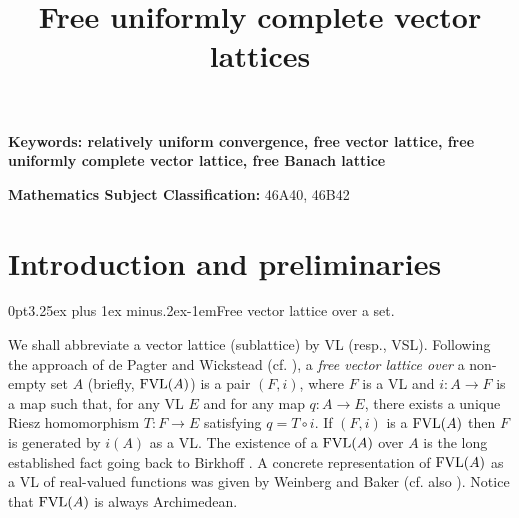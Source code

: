 \documentclass[12pt]{article}
\makeatletter
\newcommand{\R}{\mathbb{R}}
\renewcommand{\subsection}{\@startsection{subsection}{1}
{0pt}{3.25ex plus 1ex minus.2ex}{-1em}{\normalfont\normalsize\bf}}
\makeatother
\begin{document}
\title{Free uniformly complete vector lattices}
\date{\empty}
\maketitle
\author{}
\maketitle

\medskip
\medskip
\medskip

{\bf{Keywords:} \rm relatively uniform convergence, free vector lattice, 
free uniformly complete vector lattice, free Banach lattice}

\medskip

{\bf  Mathematics Subject Classification:} {\normalsize  46A40, 46B42}

%


\section{Introduction and preliminaries}

\subsection{Free vector lattice over a set.}

We shall abbreviate a vector lattice (sublattice) by VL (resp., VSL).
Following the approach of de Pagter and Wickstead (cf. \cite[Definition 3.1]{PW}),
a {\em free vector lattice over} a non-empty set $A$ (briefly, $\text{\rm FVL}(A)$) 
is a pair $(F,i)$, where $F$ is a VL and $i:A\to F$ is a map such that, 
for any VL $E$ and for any map $q :A\to E$, there exists 
a unique Riesz homomorphism $T: F \to E$ satisfying 
$q=T \circ i$. If $(F,i)$ is a $\text{\rm FVL}(A)$ then $F$ is generated by $i(A)$ as a VL. 
The existence of a $\text{\rm FVL}(A)$ over $A$ is the long 
established fact going back to Birkhoff \cite{Birk}. A concrete representation 
of $\text{\rm FVL}(A)$ as a VL of real-valued functions was 
given by Weinberg \cite{Wein} and Baker \cite{Baker} 
(cf. also \cite{Blei}). Notice that $\text{\rm FVL}(A)$ is always Archimedean.
\end{document}
